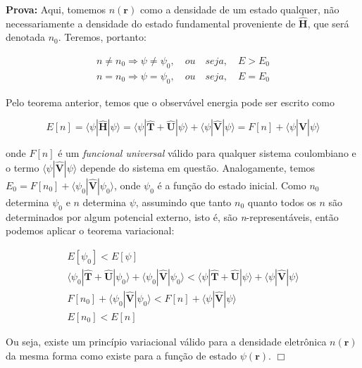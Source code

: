 		\textbf{Prova:} Aqui, tomemos $n(\textbf{r})$ como a densidade de um estado qualquer, não necessariamente a densidade do estado fundamental proveniente de $\hat{\textbf{H}}$, que será denotada $n_0$. Teremos, portanto:
		
		\begin{equation}
			\begin{array}{l}
				n \neq n_0 \Rightarrow \psi \neq \psi_0, \quad ou \quad seja, \quad E>E_0 \\
			    n = n_0 \Rightarrow \psi = \psi_0, \quad ou \quad seja, \quad E=E_0
			\end{array}
		\end{equation}
		
		Pelo teorema anterior, temos que o observável energia pode ser escrito como
		
		\begin{equation}
		E[n] = \langle \psi | \hat{\textbf{H}} | \psi \rangle = \langle \psi | \hat{\textbf{T}} + \hat{\textbf{U}} | \psi \rangle + \langle \psi | \hat{\textbf{V}} | \psi \rangle = F[n] + \langle \psi | \hat{\textbf{V}} | \psi \rangle 
		\end{equation}
		
		onde $F[n]$ é um \textit{funcional universal} válido para qualquer sistema coulombiano e o termo $\langle \psi | \hat{\textbf{V}} | \psi \rangle $ depende do sistema em questão. Analogamente, temos $E_0 = F[n_0] + \langle \psi_0 | \hat{\textbf{V}} | \psi_0 \rangle $, onde $\psi_0$ é a função do estado inicial. Como $n_0$ determina $\psi_0$ e $n$ determina $\psi$, assumindo que tanto $n_0$ quanto todos os $n$ são determinados por algum potencial externo, isto é, são \textit{n}-representáveis, então podemos aplicar o teorema variacional:
		
		\begin{gather}
				E[\psi_0] < E[\psi] \\
				\langle \psi_0 | \hat{\textbf{T}} + \hat{\textbf{U}} | \psi_0 \rangle + \langle \psi_0 | \hat{\textbf{V}} | \psi_0 \rangle < \langle \psi | \hat{\textbf{T}} + \hat{\textbf{U}} | \psi \rangle + \langle \psi | \hat{\textbf{V}} | \psi \rangle \\
				F[n_0] + \langle \psi_0 | \hat{\textbf{V}} | \psi_0 \rangle < F[n] + \langle \psi | \hat{\textbf{V}} | \psi \rangle \\ 
				E[n_0] < E[n]
		\end{gather} 
		
		Ou seja, existe um princípio variacional válido para a densidade eletrônica $n(\textbf{r})$ da mesma forma como existe para a função de estado $\psi(\textbf{r})$. $\Box$
		
